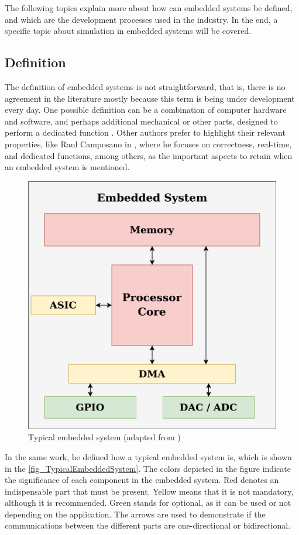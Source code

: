 The following topics explain more about how can embedded systems be defined, and which are the development processes used in the industry. 
In the end, a specific topic about simulation in embedded systems will be covered.

\subsection{Definition}

The definition of embedded systems is not straightforward, that is, there is no agreement in the literature mostly because this term is being 
under development every day. One possible definition can be a combination of computer hardware and software, and perhaps additional mechanical 
or other parts, designed to perform a dedicated function \cite{EmbeddedSystemsGlossary}. Other authors prefer to highlight their relevant 
properties, like Raul Camposano in \cite{camposano1996embedded}, where he focuses on correctness, real-time, and dedicated functions, among 
others, as the important aspects to retain when an embedded system is mentioned. 

\begin{figure}[H]
	\centering
 	\includegraphics[width=0.6\linewidth]{Images/TypicalEmbeddedSystem.png}
 	\caption{Typical embedded system (adapted from \cite{camposano1996embedded})}
	 \label{fig_TypicalEmbeddedSystem}
\end{figure}

In the same work, he defined how a typical embedded system is, which is shown in the \autoref{fig_TypicalEmbeddedSystem}. The colors depicted 
in the figure indicate the significance of each component in the embedded system. Red denotes an indispensable part that must be present. Yellow 
means that it is not mandatory, although it is recommended. Green stands for optional, as it can be used or not depending on the application. The 
arrows are used to demonstrate if the communications between the different parts are one-directional or bidirectional. 

